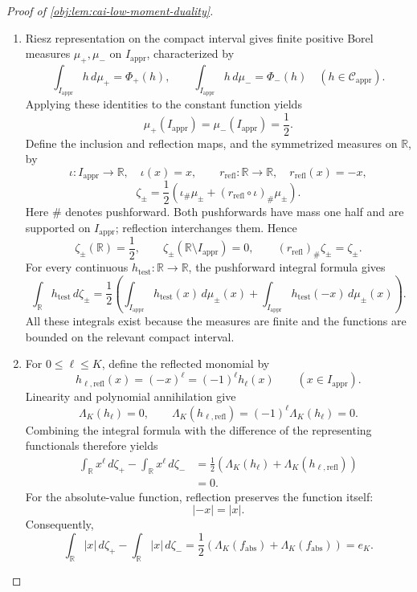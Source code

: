 \documentclass[11pt]{article}
\begin{document}
\begin{proof}[Proof of \cref{obj:lem:cai-low-moment-duality}]
\begin{enumerate}
\item Riesz representation on the compact interval gives finite positive Borel measures \(\mu_+,\mu_-\) on \(I_{\mathrm{appr}}\), characterized by
\[
\int_{I_{\mathrm{appr}}}h\,d\mu_+=\Phi_+(h),\qquad
\int_{I_{\mathrm{appr}}}h\,d\mu_-=\Phi_-(h)
\quad(h\in\mathcal C_{\mathrm{appr}}).
\]
Applying these identities to the constant function yields
\[
\mu_+(I_{\mathrm{appr}})=\mu_-(I_{\mathrm{appr}})=\frac12.
\]
Define the inclusion and reflection maps, and the symmetrized measures on \(\mathbb R\), by
\[
\iota:I_{\mathrm{appr}}\longrightarrow\mathbb R,\quad \iota(x)=x,
\qquad
r_{\mathrm{refl}}:\mathbb R\longrightarrow\mathbb R,\quad
r_{\mathrm{refl}}(x)=-x,
\]
\[
\zeta_\pm
=\frac12\left(\iota_\#\mu_\pm
 +(r_{\mathrm{refl}}\circ\iota)_\#\mu_\pm\right).
\]
Here \(\#\) denotes pushforward. Both pushforwards have mass one half and are supported on \(I_{\mathrm{appr}}\); reflection interchanges them. Hence
\[
\zeta_\pm(\mathbb R)=\frac12,\qquad
\zeta_\pm(\mathbb R\setminus I_{\mathrm{appr}})=0,\qquad
(r_{\mathrm{refl}})_\#\zeta_\pm=\zeta_\pm.
\]
For every continuous \(h_{\mathrm{test}}:\mathbb R\to\mathbb R\), the pushforward integral formula gives
\[
\int_{\mathbb R}h_{\mathrm{test}}\,d\zeta_\pm
=\frac12\left(
\int_{I_{\mathrm{appr}}}h_{\mathrm{test}}(x)\,d\mu_\pm(x)
+\int_{I_{\mathrm{appr}}}h_{\mathrm{test}}(-x)\,d\mu_\pm(x)
\right).
\]
All these integrals exist because the measures are finite and the functions are bounded on the relevant compact interval.

\item For \(0\le\ell\le K\), define the reflected monomial by
\[
h_{\ell,\mathrm{refl}}(x)=(-x)^\ell=(-1)^\ell h_\ell(x)
\qquad(x\in I_{\mathrm{appr}}).
\]
Linearity and polynomial annihilation give
\[
\Lambda_K(h_\ell)=0,\qquad
\Lambda_K(h_{\ell,\mathrm{refl}})
=(-1)^\ell\Lambda_K(h_\ell)=0.
\]
Combining the integral formula with the difference of the representing functionals therefore yields
\[
\begin{aligned}
\int_{\mathbb R}x^\ell\,d\zeta_+
-\int_{\mathbb R}x^\ell\,d\zeta_-
&=\frac12\left(
\Lambda_K(h_\ell)+\Lambda_K(h_{\ell,\mathrm{refl}})
\right)\\
&=0.
\end{aligned}
\]
For the absolute-value function, reflection preserves the function itself:
\[
|-x|=|x|.
\]
Consequently,
\[
\int_{\mathbb R}|x|\,d\zeta_+
-\int_{\mathbb R}|x|\,d\zeta_-
=\frac12\left(
\Lambda_K(f_{\mathrm{abs}})+\Lambda_K(f_{\mathrm{abs}})
\right)
=e_K.
\]


\end{enumerate}
\end{proof}
\end{document}
